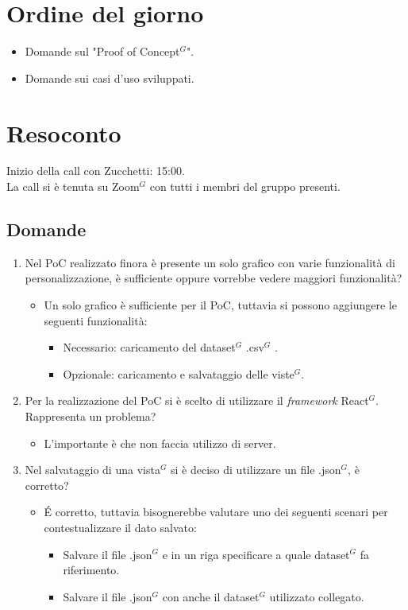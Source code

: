 \section{Ordine del giorno}

\begin{itemize}
	\item Domande sul "Proof of Concept$^{G}$".
	\item Domande sui casi d'uso sviluppati.
\end{itemize}

\section{Resoconto}
\label{sec:Resoconto}

\noindent 
Inizio della call con Zucchetti: 15:00. \\
\noindent La call si è tenuta su Zoom$^{G}$ con tutti i membri del gruppo presenti.

\subsection{Domande}
\begin{enumerate}
	\item Nel PoC realizzato finora è presente un solo grafico con varie funzionalità di personalizzazione, è sufficiente oppure vorrebbe vedere maggiori funzionalità?
	\begin{itemize}
		\item Un solo grafico è sufficiente per il PoC, tuttavia si possono aggiungere le seguenti funzionalità:
		\begin{itemize}
			\item Necessario: caricamento del dataset$^{G}$ .csv$^{G}$ .
			\item Opzionale: caricamento e salvataggio delle viste$^{G}$.
		\end{itemize}
	\end{itemize}
	\item Per la realizzazione del PoC si è scelto di utilizzare il \textit{framework} React$^{G}$. Rappresenta un problema?
	\begin{itemize}
		\item L'importante è che non faccia utilizzo di server.
	\end{itemize}
	\item Nel salvataggio di una vista$^{G}$ si è deciso di utilizzare un file .json$^{G}$, è corretto?
	\begin{itemize}
		\item \' E corretto, tuttavia bisognerebbe valutare uno dei seguenti scenari per contestualizzare il dato salvato:
		\begin{itemize}
			\item Salvare il file .json$^{G}$ e in un riga specificare a quale dataset$^{G}$ fa riferimento.
			\item Salvare il file .json$^{G}$ con anche il dataset$^{G}$ utilizzato collegato.
		\end{itemize}
	\end{itemize}
\end{enumerate}

